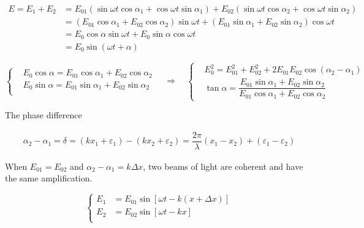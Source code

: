\begin{equation*}
  \begin{aligned}
    E = E_1 + E_2 &= E_{01} \left( \sin \omega t \cos \alpha_1 + \cos \omega t \sin \alpha_1 \right) + E_{02} \left( \sin \omega t \cos \alpha_2 + \cos \omega t \sin \alpha_2  \right) \\
    &= \left( E_{01} \cos \alpha_1 + E_{02} \cos \alpha_2 \right) \sin \omega t + \left( E_{01} \sin \alpha_1 + E_{02} \sin \alpha_2 \right) \cos \omega t \\
    &= E_0 \cos \alpha \sin \omega t + E_0 \sin \alpha \cos \omega t \\
    &= E_0 \sin \left( \omega t + \alpha \right)
  \end{aligned}
\end{equation*}

\begin{equation*}
  \left\{
    \begin{aligned}
      & E_0 \cos \alpha = E_{01} \cos \alpha_1 + E_{02} \cos \alpha_2 \\
      & E_0 \sin \alpha = E_{01} \sin \alpha_1 + E_{02} \sin \alpha_2 \\
    \end{aligned}
  \right.
  \quad \Rightarrow \quad 
  \left\{
    \begin{aligned}
      & E_0^2 = E_{01}^2 + E_{02}^2 + 2 E_{01} E_{02} \cos \left( \alpha_2 - \alpha_1 \right) \\
      & \tan \alpha = \dfrac{E_{01} \sin \alpha_1 + E_{02} \sin \alpha_2}{E_{01} \cos \alpha_1 + E_{02} \cos \alpha_2} 
    \end{aligned}
  \right.
\end{equation*}

The phase difference

\begin{equation*}
  \begin{aligned}
    \alpha_2 - \alpha_1 = \delta = \left( k x_1 + \varepsilon_1 \right) - \left( k x_2 + \varepsilon_2 \right) = \dfrac{2 \pi}{\lambda} \left( x_1 - x_2 \right) + \left( \varepsilon_1 - \varepsilon_2 \right)
  \end{aligned}
\end{equation*}

When $E_{01} = E_{02}$ and $\alpha_2 - \alpha_1 = k \Delta x$, two beams of light are coherent and have the same amplification.

\begin{equation*}
  \left\{
  \begin{aligned}
    E_1 &= E_{01} \sin \left[ \omega t - k \left( x + \Delta x \right) \right] \\
    E_2 &= E_{02} \sin \left[ \omega t - k x \right] \\
  \end{aligned}
  \right.
\end{equation*}

